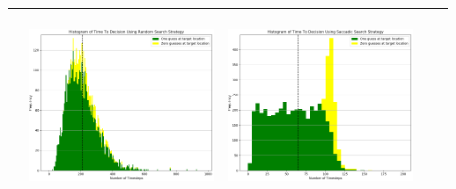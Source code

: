 \begin{landscape}
\begin{table}[h!]
\begin{tabular}{ | c | c | c | c | c |}
\begin{minipage}[c][52mm][c]{49mm}
    \end{minipage}
    &
    \begin{minipage}[c][52mm][c]{49mm}
      \includegraphics[width=49mm, height=49mm]{Chapters/MultiAgentTargetDetection/Figs/Histograms/MultipleAgent/3/SingleAgentSingleSource3RandomHistogram.png}
    \end{minipage}
    &
    \begin{minipage}[c][52mm][c]{49mm}
      \includegraphics[width=49mm, height=49mm]{Chapters/MultiAgentTargetDetection/Figs/Histograms/MultipleAgent/3/SingleAgentSingleSource3SaccadicHistogram.png}
    \end{minipage}
    \\
    \hline
   
  \end{tabular}
  \label{table:HistVaryingNoSearchAgents}
\end{table}


\end{landscape}
